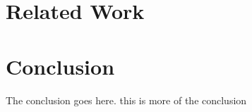 \documentclass[preprint]{sigplanconf}
\begin{document}



\section{Related Work} \label{sec:related}
\section{Conclusion} \label{sec:conclu}
The conclusion goes here. this is more of the conclusion











\appendix
\end{document}
